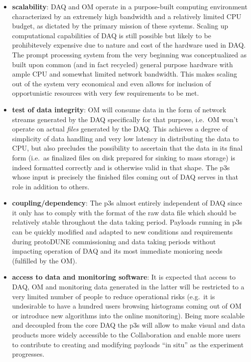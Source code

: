 \documentclass[pdftex,12pt,letter]{article}
\newcommand{\pd}{protoDUNE\xspace}
\begin{document}
\begin{itemize}

\item \textbf{scalability}: DAQ and OM operate in a purpose-built computing environment characterized
by an extremely high bandwidth and a relatively limited CPU budget, as dictated by the
primary mission of these systems. Scaling up computational capabilities of DAQ
is still possible but likely to be prohibitevely expensive due to nature and cost of
the hardware used in DAQ. The prompt processing system from the very beginning
was conceptualized as built upon common (and in fact recycled) general purpose hardware
with ample CPU and somewhat limited network bandwidth. This makes scaling out of
the system very economical and even allows for inclusion of opportunistic resources
with very few requirements to be met.

\item \textbf{test of data integrity}: OM will consume data in the form of network streams generated
by the DAQ specifically for that purpose, i.e.~OM won't operate on actual \textit{files} generated
by the DAQ. This achieves a degree of simplicity of data handling and very low latency
in distributing the data to CPU, but also precludes the possibility to ascertain that the data
in its final form (i.e.~as finalized files on disk prepared for sinking to mass storage) is indeed
formatted correctly and is otherwise valid in that shape. The p3s whose input is precisely the finished
files coming out of DAQ serves in that role in addition to others.

\item \textbf{coupling/dependency}: 
The p3s almost entirely independent of DAQ since it only has to comply with the format
of the raw data file which should be relatively stable
throughout the data taking period. Payloads running in p3s can be quickly modified
and adapted to new conditions and requirements during \pd commissioning and
data taking periods without impacting operation of DAQ and its most immediate
monioring needs (fulfilled by the OM).

\item \textbf{access to data and monitoring software}:
It is expected that access to DAQ, OM and monitoring data generated in the latter will be
restricted to a very limited number of people to reduce operational risks 
(e.g.~it is undesirable to have a hundred users browsing histograms coming out of OM
or introduce new algorithms into the online monitoring). Being more scalable and 
decoupled from the core DAQ the p3s will allow to make visual and data products
more widely accessible to the Collaboration and enable more users to contribute
to creating and modifying payloads ``in situ'' as the experiment progresses.


\end{itemize}
\end{document}

